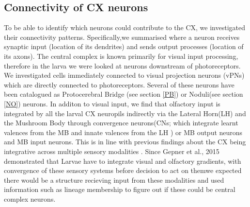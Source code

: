     \subsection{Connectivity of CX neurons}
    To be able to identify which neurons could contribute to the CX, we investigated their connectivity patterns. Specifically,we summarised where a neuron receives synaptic input (location of its dendrites) and sends output processes (location of its axons).
    The central complex is known primarily for visual input processing, therefore in the larva we were looked at neurons downstream of photoreceptors. We investigated cells immediately connected to visual projection neurons (vPNs) which are directly connected to photoreceptors. Several of these neurons have been catalogued as Protocerebral Bridge (see section \ref{PB}) or Noduli(see section \ref{NO}) neurons. 
    In additon to visual input, we find that olfactory input is integrated by all the larval CX neuropils indirectly via the Lateral Horn(LH) and the Mushroom Body through convergence neurons(CNs; which integrate learnt valences from the MB and innate valences from the LH \citep{eschbach2021circuits}) or MB output neurons and MB input neurons. This is in line with previous findings about the CX being integrative across multiple sensory modalities \citep{hulse2021connectome}. Since Gepner et al., 2015 demonstrated that Larvae  have to integrate visual and olfactory gradients, with convergence of these sensory systems before decision to act on themwe expected there would be a structure recieving input from these modalities and used information such as lineage membership to figure out if these could be central complex neurons. 

